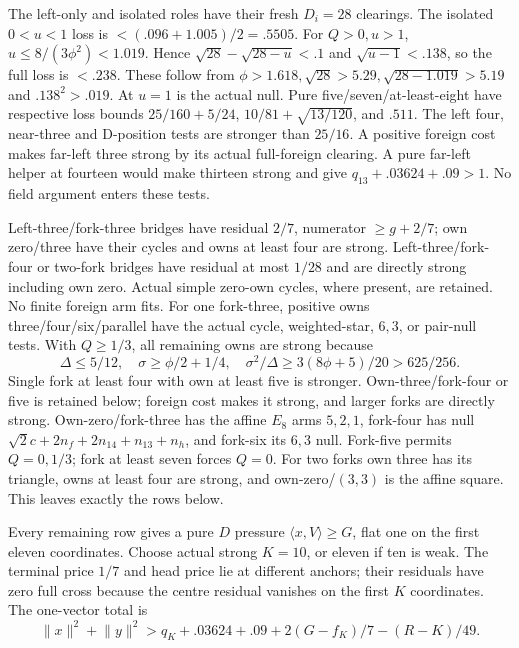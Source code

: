 \documentclass[11pt]{article}
\theoremstyle{definition}
\theoremstyle{remark}
\newcommand{\ip}[2]{\langle #1,#2\rangle}
\newcommand{\norm}[1]{\lVert #1\rVert}
\begin{document}
The left-only and isolated roles have their fresh \(D_i=28\)
clearings. The isolated \(0<u<1\) loss is
\(<(.096+1.005)/2=.5505\). For \(Q>0,u>1\),
\(u\le8/(3\phi^2)<1.019\). Hence
\(\sqrt{28}-\sqrt{28-u}<.1\) and \(\sqrt{u-1}<.138\),
so the full loss is \(<.238\). These follow from
\(\phi>1.618,\sqrt{28}>5.29,\sqrt{28-1.019}>5.19\) and
\(.138^2>.019\). At \(u=1\) is the actual null. Pure five/seven/at-least-eight have respective
loss bounds \(25/160+5/24\), \(10/81+\sqrt{13/120}\),
and \(.511\). The left four, near-three and D-position tests
are stronger than \(25/16\). A positive foreign cost makes
far-left three strong by its actual full-foreign clearing. A pure
far-left helper at fourteen would make thirteen strong and give
\(q_{13}+.03624+.09>1\). No field argument enters these tests.

Left-three/fork-three bridges have residual \(2/7\), numerator
\(\ge g+2/7\); own zero/three have their cycles and owns at
least four are strong. Left-three/fork-four or two-fork bridges
have residual at most \(1/28\) and are directly strong including
own zero. Actual simple zero-own cycles, where present, are retained. No finite foreign arm fits.
For one fork-three, positive owns three/four/six/parallel have
the actual cycle, weighted-star, \(6,3\), or pair-null tests.
With \(Q\ge1/3\), all remaining owns are strong because
\[
 \Delta\le5/12,\quad \sigma\ge\phi/2+1/4,\quad
 \sigma^2/\Delta\ge3(8\phi+5)/20>625/256.
\]
Single fork at least four with own at least five is stronger.
Own-three/fork-four or five is retained below; foreign cost makes
it strong, and larger forks are directly strong. Own-zero/fork-three
has the affine \(E_8\) arms \(5,2,1\), fork-four has null
\(\sqrt2c+2n_f+2n_{14}+n_{13}+n_h\), and fork-six its
\(6,3\) null. Fork-five permits \(Q=0,1/3\); fork at least
seven forces \(Q=0\). For two forks own three has its triangle,
owns at least four are strong, and own-zero/\((3,3)\) is the
affine square. This leaves exactly the rows below.

Every remaining row gives a pure \(D\) pressure \(\ip xV\ge G\),
flat one on the first eleven coordinates. Choose actual strong
\(K=10\), or eleven if ten is weak. The terminal price \(1/7\)
and head price lie at different anchors; their residuals have
zero full cross because the centre residual vanishes on the
first \(K\) coordinates. The one-vector total is
\begin{equation}\label{eq:D16typedcentre}
 \norm x^2+\norm y^2>
 q_K+.03624+.09+2(G-f_K)/7-(R-K)/49.
\end{equation}
\end{document}
